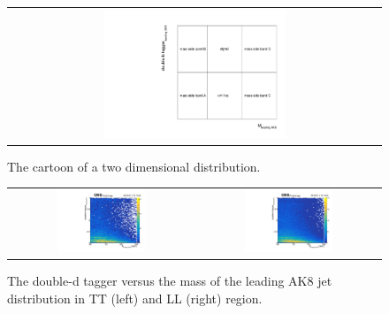 \begin{figure}[t]
  \centering
  \begin{tabular}{c}
    \includegraphics[width=0.5\textwidth]{Figures/cart2.pdf} 
 
  \end{tabular}
  \caption{The cartoon of a two dimensional distribution.}
  \begin{tabular}{cc}
    \includegraphics[width=0.5\textwidth]{Figures/al/2d_TT.pdf} &
   \includegraphics[width=0.5\textwidth]{Figures/al/2d_LL.pdf} 
  \end{tabular}
  \caption{The double-d tagger versus the mass of the leading AK8 jet distribution in TT (left) and LL (right) region.}
\end{figure}



